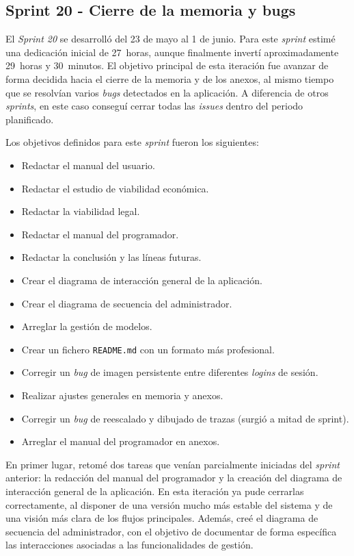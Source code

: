 \subsection{Sprint 20 - Cierre de la memoria y bugs}
El \textit{Sprint 20} se desarrolló del 23 de mayo al 1 de junio. Para este \textit{sprint} estimé una dedicación inicial de 27~horas, aunque finalmente invertí aproximadamente 29~horas y 30~minutos. El objetivo principal de esta iteración fue avanzar de forma decidida hacia el cierre de la memoria y de los anexos, al mismo tiempo que se resolvían varios \textit{bugs} detectados en la aplicación. A diferencia de otros \textit{sprints}, en este caso conseguí cerrar todas las \textit{issues} dentro del periodo planificado.

Los objetivos definidos para este \textit{sprint} fueron los siguientes:
\begin{itemize}
	\item Redactar el manual del usuario.
	\item Redactar el estudio de viabilidad económica.
	\item Redactar la viabilidad legal.
	\item Redactar el manual del programador.
	\item Redactar la conclusión y las líneas futuras.
	\item Crear el diagrama de interacción general de la aplicación.
	\item Crear el diagrama de secuencia del administrador.
	\item Arreglar la gestión de modelos.
	\item Crear un fichero \texttt{README.md} con un formato más profesional.
	\item Corregir un \textit{bug} de imagen persistente entre diferentes \textit{logins} de sesión.
	\item Realizar ajustes generales en memoria y anexos.
	\item Corregir un \textit{bug} de reescalado y dibujado de trazas (surgió a mitad de sprint).
	\item Arreglar el manual del programador en anexos.
\end{itemize}

En primer lugar, retomé dos tareas que venían parcialmente iniciadas del \textit{sprint} anterior: la redacción del manual del programador y la creación del diagrama de interacción general de la aplicación. En esta iteración ya pude cerrarlas correctamente, al disponer de una versión mucho más estable del sistema y de una visión más clara de los flujos principales. Además, creé el diagrama de secuencia del administrador, con el objetivo de documentar de forma específica las interacciones asociadas a las funcionalidades de gestión.

